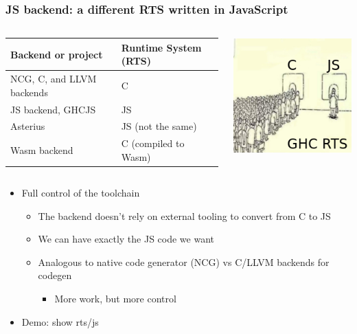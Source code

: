 \documentclass[aspectratio=169]{beamer}
\begin{document}
\begin{frame}
\frametitle{JS backend: a different RTS written in JavaScript}

\begin{columns}

\begin{column}{0.7\textwidth}
\resizebox{8cm}{!}
{
\begin{tabular}{ll}
\hline
\textbf{Backend or project} & \textbf{Runtime System (RTS)} \\ \hline
NCG, C, and LLVM backends & C \\
JS backend, GHCJS         & JS \\
Asterius                  & JS (not the same) \\
Wasm backend & C (compiled to Wasm) \\ \hline
\end{tabular}
}
\end{column}

\begin{column}{0.2\textwidth}
\includegraphics[scale=0.3]{images/queue_rts.png}
\end{column}
\end{columns}

\vspace{1cm}

\begin{itemize}
\item Full control of the toolchain
\begin{itemize}
\item The backend doesn’t rely on external tooling to convert from C to JS
\item We can have exactly the JS code we want
\item Analogous to native code generator (NCG) vs C/LLVM backends for codegen
  \begin{itemize}
    \item More work, but more control
  \end{itemize}
\end{itemize}
\item Demo: show rts/js
\end{itemize}
\end{frame}
\end{document}
